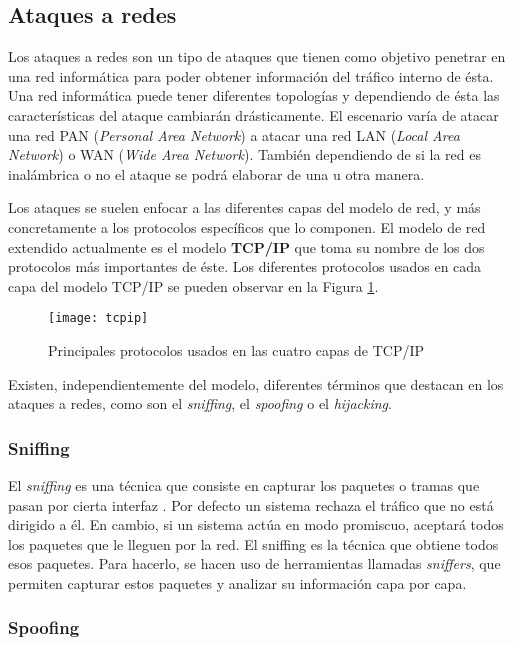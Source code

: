 \subsection{Ataques a redes}

Los ataques a redes son un tipo de ataques que tienen como objetivo penetrar en una red informática para poder obtener información del tráfico interno de ésta. Una red informática puede tener diferentes topologías y dependiendo de ésta las características del ataque cambiarán drásticamente. El escenario varía de atacar una red PAN (\textit{Personal Area Network}) a atacar una red LAN (\textit{Local Area Network}) o WAN (\textit{Wide Area Network}). También dependiendo de si la red es inalámbrica o no el ataque se podrá elaborar de una u otra manera.

Los ataques se suelen enfocar a las diferentes capas del modelo de red, y más concretamente a los protocolos específicos que lo componen. El modelo de red extendido actualmente es el modelo \textbf{TCP/IP} que toma su nombre de los dos protocolos más importantes de éste. Los diferentes protocolos usados en cada capa del modelo TCP/IP se pueden observar en la Figura \ref{fig:tcpip}.

\begin{figure}[H]
	\centering
	\texttt{[image: tcpip]}
	\caption{Principales protocolos usados en las cuatro capas de TCP/IP}
	\label{fig:tcpip}
\end{figure}

Existen, independientemente del modelo, diferentes términos que destacan en los ataques a redes, como son el \textit{sniffing}, el \textit{spoofing} o el \textit{hijacking}.

\subsubsection{Sniffing}

El \emph{sniffing} es una técnica que consiste en capturar los paquetes o tramas que pasan por cierta interfaz \cite{ataque-en-redes-ip}. Por defecto un sistema rechaza el tráfico que no está dirigido a él. En cambio, si un sistema actúa en modo promiscuo, aceptará todos los paquetes que le lleguen por la red. El sniffing es la técnica que obtiene todos esos paquetes. Para hacerlo, se hacen uso de herramientas llamadas \textit{sniffers}, que permiten capturar estos paquetes y analizar su información capa por capa.

\subsubsection{Spoofing}

